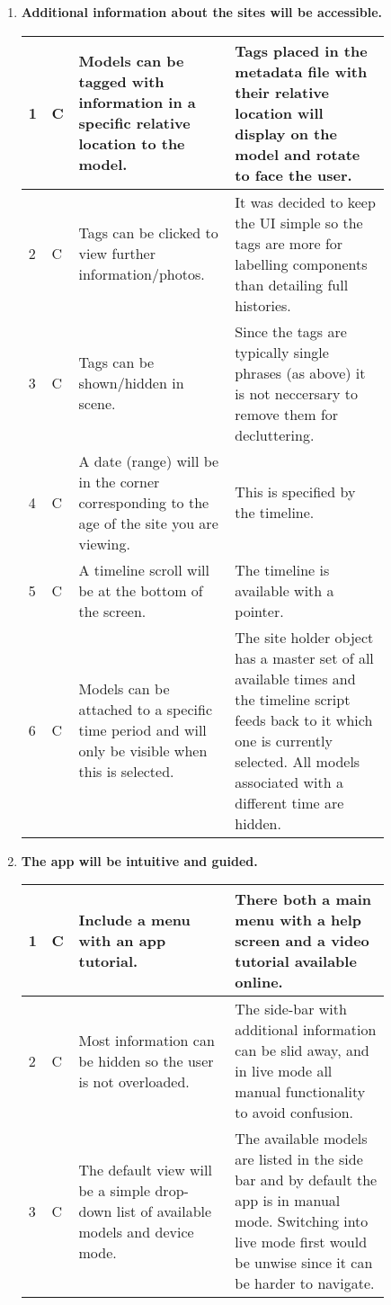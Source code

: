 \documentclass[12pt, a4paper]{article}
\newcommand{\light}[1]{\textcolor{mygrey}{#1}}
\begin{document}
\begin{enumerate}[label=\Roman*.]
\item \textbf{Additional information about the sites will be accessible.}

\begin{table}[H]
\begin{tabular}{| p{0.02\linewidth} | p{0.02\linewidth} | p{0.4\linewidth} | p{0.4\linewidth} | }
\hline
1 & C & \light{Models can be tagged with information in a specific relative location to the model.} & Tags placed in the metadata file with their relative location will display on the model and rotate to face the user. \\ \hline
2 & C & Tags can be clicked to view further information/photos. & It was decided to keep the UI simple so the tags are more for labelling components than detailing full histories. \\ \hline
3 & C & Tags can be shown/hidden in scene. & Since the tags are typically single phrases (as above) it is not neccersary to remove them for decluttering. \\ \hline
4 & C & \light{A date (range) will be in the corner corresponding to the age of the site you are viewing.} & This is specified by the timeline. \\ \hline
5 & C & \light{A timeline scroll will be at the bottom of the screen.} & The timeline is available with a pointer. \\ \hline
6 & C & \light{Models can be attached to a specific time period and will only be visible when this is selected.} & The site holder object has a master set of all available times and the timeline script feeds back to it which one is currently selected. All models associated with a different time are hidden. \\ \hline
\end{tabular}
\end{table}

\item \textbf{The app will be intuitive and guided.}

\begin{table}[H]
\begin{tabular}{| p{0.02\linewidth} | p{0.02\linewidth} | p{0.4\linewidth} | p{0.4\linewidth} | }
\hline
1 & C & \light{Include a menu with an app tutorial.} & There both a main menu with a help screen and a video tutorial available online. \\ \hline
2 & C & \light{Most information can be hidden so the user is not overloaded.} & The side-bar with additional information can be slid away, and in live mode all manual functionality to avoid confusion. \\ \hline
3 & C & \light{The default view will be a simple drop-down list of available models and device mode.} & The available models are listed in the side bar and by default the app is in manual mode. Switching into live mode first would be unwise since it can be harder to navigate. \\ \hline
\end{tabular}
\end{table}

\end{enumerate}
\end{document}
